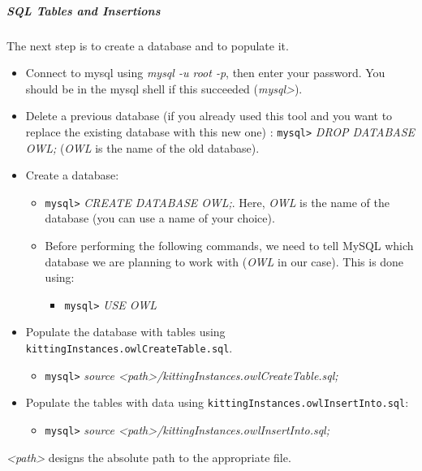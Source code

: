 \subparagraph{SQL Tables and Insertions}
The next step is to create a database and to populate it.

\begin{itemize}
\item Connect to mysql using \textit{mysql -u root -p}, then enter your password. You should be in the mysql shell if this succeeded (\textit{mysql>}).
\item Delete a previous database (if you already used this tool and you want to replace the existing database with this new one) :
\texttt{mysql>} \textit{DROP DATABASE OWL;} (\textit{OWL} is the name of the old database).
\item Create a database:
\begin{itemize}
\item \texttt{mysql>} \textit{CREATE DATABASE OWL;}. Here, \textit{OWL} is the name of the database (you can use a name of your choice).
\item Before performing the following commands, we need to tell MySQL which database we are planning to work with (\textit{OWL} in our case). This is done using:
\begin{itemize}
\item[] \texttt{mysql>} \textit{USE OWL}
\end{itemize}
\end{itemize}
\item Populate the database with tables using \texttt{kittingInstances.owlCreateTable.sql}.
\begin{itemize}
 \item \texttt{mysql>} \textit{source <path>/kittingInstances.owlCreateTable.sql;}
\end{itemize}

\item Populate the tables with data using \texttt{kittingInstances.owlInsertInto.sql}:
\begin{itemize}
 \item \texttt{mysql>} \textit{source <path>/kittingInstances.owlInsertInto.sql;}
\end{itemize}
\end{itemize}

\textit{<path>} designs the absolute path to the appropriate file.

